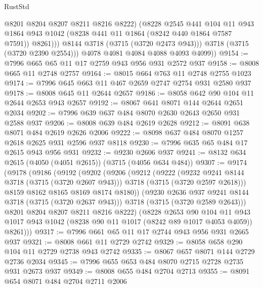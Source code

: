 \begin{lexlean}{RustStd}
\begin{coremodule}
                  @8201
                  @8204
                  @8207
                  @8211
                  @8216
                  @8222)
                (@8228
                  @2545
                  @441
                  @104
                  @11
                  @943
                  @1864
                  @943
                  @1042
                  (@8238 @441 @11 @1864 (@8242 @440 @1864 @7587 @7591))
                  @8261)))
            @8144
            @3718
            (@3715 (@3720 @2473 @943)))
          @3718
          (@3715 (@3720 @2390 @2554)))
        @4078
        @4081
        @4084
        @4088
        @4093
        @4099))
@9154 := @7996 @665 @65 @11 @17 @2759 @943 @956 @931 @2572 @937
@9158 := @8008 @665 @11 @2748 @2757
@9164 := @8015 @664 @763 @11 @2748 @2755 @1023
@9174 := @7996 @645 @663 @11 @467 @2659 @2747 @2754 @931 @2580 @937
@9178 := @8008 @645 @11 @2644 @2657
@9186 := @8058 @642 @90 @104 @11 @2644 @2653 @943 @2657
@9192 := @8067 @641 @8071 @144 @2644 @2651 @2034
@9202 := @7996 @639 @637 @484 @8070 @2630 @2643 @2650 @931 @2588 @937
@9206 := @8008 @639 @484 @2619 @2628
@9212 := @8091 @638 @8071 @484 @2619 @2626 @2006
@9222 := @8098 @637 @484 @8070 @1257 @2618 @2625 @931 @2596 @937 @8118
@9230 := @7996 @635 @65 @484 @17 @2615 @943 @956 @931
@9232 := @9230 @2606 @937
@9241 := @8132 @634 @2615 (@4050 (@4051 @2615)) (@3715 (@4056 @634 @484))
@9307 := @9174
    (@9178
      (@9186
        (@9192
          (@9202
            (@9206
              (@9212
                (@9222
                  (@9232 @9241 @8144 @3718 (@3715 (@3720 @2607 @943)))
                  @3718
                  (@3715 (@3720 @2597 @2618)))
                @8159
                @8162
                @8165
                @8169
                @8174
                @8180))
            (@9230 @2636 @937 @9241 @8144 @3718 (@3715 (@3720 @2637 @943)))
            @3718
            (@3715 (@3720 @2589 @2643)))
          @8201
          @8204
          @8207
          @8211
          @8216
          @8222)
        (@8228
          @2653
          @90
          @104
          @11
          @943
          @1017
          @943
          @1042
          (@8238 @90 @11 @1017 (@8242 @89 @1017 @4053 @4059))
          @8261)))
@9317 := @7996 @661 @65 @11 @17 @2744 @943 @956 @931 @2665 @937
@9321 := @8008 @661 @11 @2729 @2742
@9329 := @8058 @658 @290 @104 @11 @2729 @2738 @943 @2742
@9335 := @8067 @657 @8071 @144 @2729 @2736 @2034
@9345 := @7996 @655 @653 @484 @8070 @2715 @2728 @2735 @931 @2673 @937
@9349 := @8008 @655 @484 @2704 @2713
@9355 := @8091 @654 @8071 @484 @2704 @2711 @2006

\end{coremodule}
\end{lexlean}
